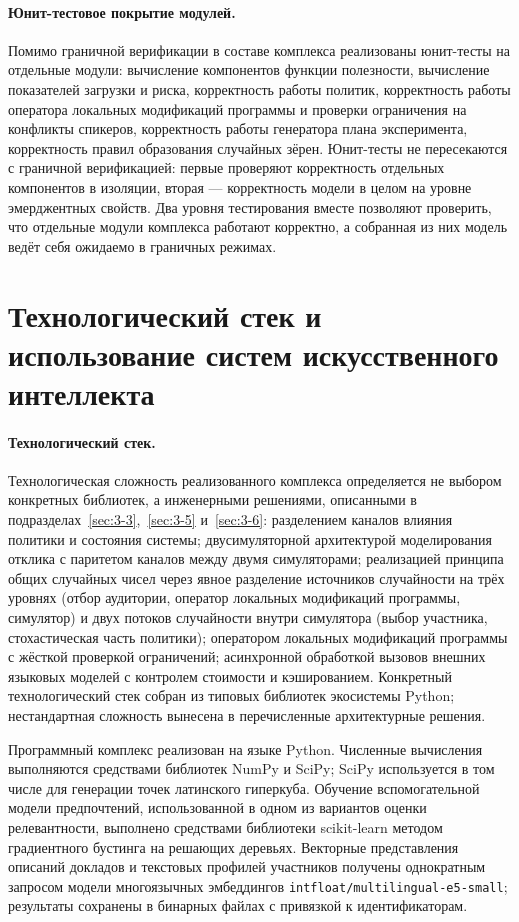 \paragraph{Юнит-тестовое покрытие модулей.}
Помимо граничной верификации в составе комплекса реализованы юнит-тесты на отдельные модули: вычисление компонентов функции полезности, вычисление показателей загрузки и риска, корректность работы политик, корректность работы оператора локальных модификаций программы и проверки ограничения на конфликты спикеров, корректность работы генератора плана эксперимента, корректность правил образования случайных зёрен. Юнит-тесты не пересекаются с граничной верификацией: первые проверяют корректность отдельных компонентов в изоляции, вторая --- корректность модели в целом на уровне эмерджентных свойств. Два уровня тестирования вместе позволяют проверить, что отдельные модули комплекса работают корректно, а собранная из них модель ведёт себя ожидаемо в граничных режимах.


\section{Технологический стек и использование систем искусственного интеллекта}
\label{sec:3-8}

\paragraph{Технологический стек.}
Технологическая сложность реализованного комплекса определяется не выбором конкретных библиотек, а инженерными решениями, описанными в подразделах~\ref{sec:3-3},~\ref{sec:3-5} и~\ref{sec:3-6}: разделением каналов влияния политики и состояния системы; двусимуляторной архитектурой моделирования отклика с паритетом каналов между двумя симуляторами; реализацией принципа общих случайных чисел через явное разделение источников случайности на трёх уровнях (отбор аудитории, оператор локальных модификаций программы, симулятор) и двух потоков случайности внутри симулятора (выбор участника, стохастическая часть политики); оператором локальных модификаций программы с жёсткой проверкой ограничений; асинхронной обработкой вызовов внешних языковых моделей с контролем стоимости и кэшированием. Конкретный технологический стек собран из типовых библиотек экосистемы Python; нестандартная сложность вынесена в перечисленные архитектурные решения.

Программный комплекс реализован на языке Python. Численные вычисления выполняются средствами библиотек NumPy и SciPy; SciPy используется в том числе для генерации точек латинского гиперкуба. Обучение вспомогательной модели предпочтений, использованной в одном из вариантов оценки релевантности, выполнено средствами библиотеки scikit-learn методом градиентного бустинга на решающих деревьях. Векторные представления описаний докладов и текстовых профилей участников получены однократным запросом модели многоязычных эмбеддингов \texttt{intfloat/multilingual-e5-small}; результаты сохранены в бинарных файлах с привязкой к идентификаторам.


